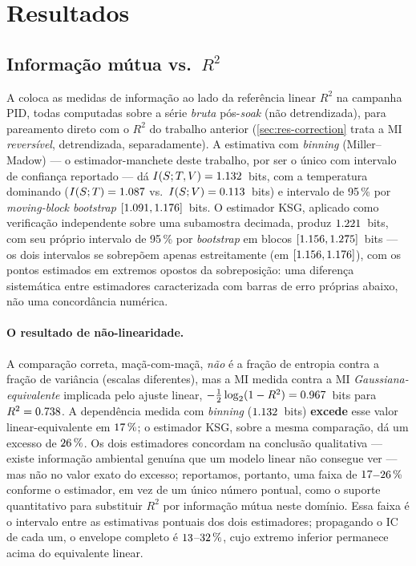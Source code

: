 \section{Resultados}
\label{sec:results}


\subsection{Informação mútua vs.\ $R^2$}
\label{sec:res-mi}
A  coloca as medidas de informação ao lado da referência
linear $R^2$ na campanha PID, todas computadas sobre a série \emph{bruta}
pós-\emph{soak} (não detrendizada), para pareamento direto com o $R^2$ do
trabalho anterior (\cref{sec:res-correction} trata a MI \emph{reversível},
detrendizada, separadamente). A estimativa com \emph{binning}
(Miller--Madow) --- o estimador-manchete deste trabalho, por ser o único com
intervalo de confiança reportado --- dá $I\!\left(S ; T,V\right)=1.132$~bits,
com a temperatura dominando ($I\!\left(S ; T\right)=1.087$ vs.\
$I\!\left(S ; V\right)=0.113$~bits) e intervalo de 95\,\% por
\emph{moving-block bootstrap} $[1.091,1.176]$~bits. O estimador
KSG, aplicado como verificação independente sobre uma subamostra decimada,
produz $1.221$~bits, com seu próprio intervalo de 95\,\% por
\emph{bootstrap} em blocos $[1.156,1.275]$~bits --- os dois
intervalos se sobrepõem apenas estreitamente (em
$[1.156,1.176]$), com os pontos estimados em extremos opostos da
sobreposição: uma diferença sistemática entre estimadores caracterizada com
barras de erro próprias abaixo, não uma concordância numérica.

\paragraph{O resultado de não-linearidade.} A comparação correta,
maçã-com-maçã, \emph{não} é a fração de entropia contra a fração de
variância (escalas diferentes), mas a MI medida contra a MI
\emph{Gaussiana-equivalente} implicada pelo ajuste linear,
$-\tfrac12\log_2(1-R^2)=0.967$~bits para $R^2=0.738$. A
dependência medida com \emph{binning} ($1.132$~bits) \textbf{excede} esse
valor linear-equivalente em $17\,\%$; o estimador KSG,
sobre a mesma comparação, dá um excesso de $26\,\%$. Os dois
estimadores concordam na conclusão qualitativa --- existe informação
ambiental genuína que um modelo linear não consegue ver --- mas não no valor
exato do excesso; reportamos, portanto, uma faixa de
\textbf{$17$--$26\,\%$} conforme o
estimador, em vez de um único número pontual, como o suporte quantitativo
para substituir $R^2$ por informação mútua neste domínio. Essa faixa é o
intervalo entre as estimativas pontuais dos dois estimadores; propagando o
IC de cada um, o envelope completo é
$13$--$32\,\%$, cujo extremo inferior
permanece acima do equivalente linear.

